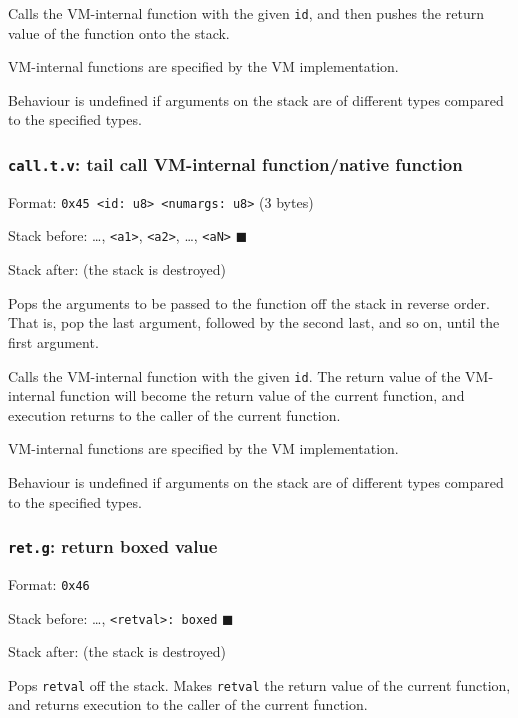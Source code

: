 Calls the VM-internal function with the given \texttt{id}, and then
pushes the return value of the function onto the stack.

VM-internal functions are specified by the VM implementation.

Behaviour is undefined if arguments on the stack are of different types
compared to the specified types.

\subsubsection{\texorpdfstring{\texttt{call.t.v}: tail call VM-internal
function/native
function}{call.t.v: tail call VM-internal function/native function}}

Format:
\texttt{0x45\ \textless{}id:\ u8\textgreater{}\ \textless{}numargs:\ u8\textgreater{}}
(3 bytes)

Stack before: \ldots, \texttt{\textless{}a1\textgreater{}},
\texttt{\textless{}a2\textgreater{}}, \ldots,
\texttt{\textless{}aN\textgreater{}} \(\blacksquare\)

Stack after: (the stack is destroyed)

Pops the arguments to be passed to the function off the stack in reverse
order. That is, pop the last argument, followed by the second last, and
so on, until the first argument.

Calls the VM-internal function with the given \texttt{id}. The return
value of the VM-internal function will become the return value of the
current function, and execution returns to the caller of the current
function.

VM-internal functions are specified by the VM implementation.

Behaviour is undefined if arguments on the stack are of different types
compared to the specified types.

\subsubsection{\texorpdfstring{\texttt{ret.g}: return boxed
value}{ret.g: return boxed value}}

Format: \texttt{0x46}

Stack before: \ldots, \texttt{\textless{}retval\textgreater{}:\ boxed}
\(\blacksquare\)

Stack after: (the stack is destroyed)

Pops \texttt{retval} off the stack. Makes \texttt{retval} the return
value of the current function, and returns execution to the caller of
the current function.

